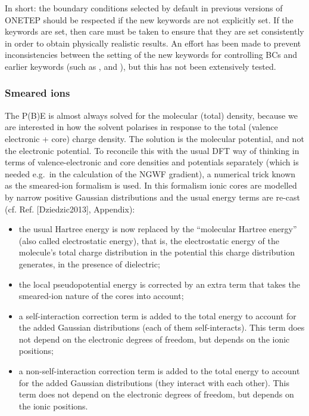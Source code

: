 \documentclass[letterpaper,10pt,english]{sphinxmanual}
\begin{document}
In short: the boundary conditions selected by default in previous
versions of ONETEP should be respected if the new keywords are not
explicitly set. If the keywords are set, then care must be taken to
ensure that they are set consistently in order to obtain physically
realistic results. An effort has been made to prevent inconsistencies
between the setting of the new keywords for controlling BCs and earlier
keywords (such as ,  and
), but this has not been extensively tested.


\subsubsection{Smeared ions}
\label{\detokenize{implicit_solvation_v3:smeared-ions}}
The P(B)E is almost always solved for the molecular (total) density,
because we are interested in how the solvent polarises in response to
the total (valence electronic + core) charge density. The solution is
the molecular potential, and not the electronic potential. To reconcile
this with the usual DFT way of thinking in terms of valence-electronic
and core densities and potentials separately (which is needed e.g. in
the calculation of the NGWF gradient), a numerical trick known as the
smeared-ion formalism is used. In this formalism ionic cores are
modelled by narrow positive Gaussian distributions and the usual energy
terms are re-cast (cf. Ref. {[}Dziedzic2013{]}, Appendix):
\begin{itemize}
\item {} 
the usual Hartree energy is now replaced by the “molecular Hartree
energy” (also called electrostatic energy), that is, the
electrostatic energy of the molecule’s total charge distribution in
the potential this charge distribution generates, in the presence of
dielectric;

\item {} 
the local pseudopotential energy is corrected by an extra term that
takes the smeared-ion nature of the cores into account;

\item {} 
a self-interaction correction term is added to the total energy to
account for the added Gaussian distributions (each of them
self-interacts). This term does not depend on the electronic degrees
of freedom, but depends on the ionic positions;

\item {} 
a non-self-interaction correction term is added to the total energy
to account for the added Gaussian distributions (they interact with
each other). This term does not depend on the electronic degrees of
freedom, but depends on the ionic positions.

\end{itemize}
\end{document}
